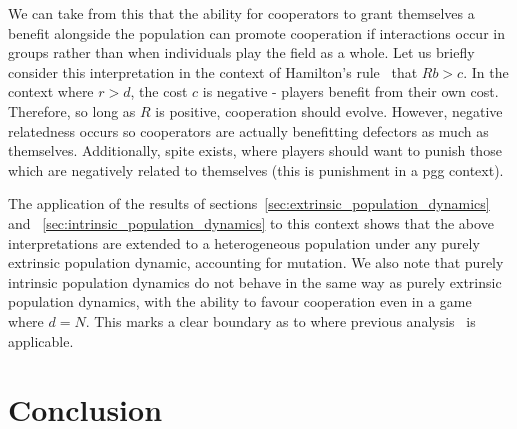 \documentclass{article}
\begin{document}
We can take from this that the ability for cooperators to grant themselves a
benefit alongside the population can promote cooperation if interactions occur
in groups rather than when individuals play the field as a whole. Let us briefly
consider this interpretation in the context of Hamilton's rule~\cite{} that \(Rb
> c\). In the context where \(r > d\), the cost \(c\) is negative - players
benefit from their own cost. Therefore, so long as \(R\) is positive,
cooperation should evolve. However, negative relatedness occurs so cooperators
are actually benefitting defectors as much as themselves. Additionally, spite
exists, where players should want to punish those which are negatively related
to themselves (this is punishment in a pgg context). 


The application of the results of
sections~\ref{sec:extrinsic_population_dynamics} and
~\ref{sec:intrinsic_population_dynamics} to this context shows that the above
interpretations are extended to a heterogeneous population under any purely
extrinsic population dynamic, accounting for mutation. We also note that purely
intrinsic population dynamics do not behave in the same way as purely extrinsic
population dynamics, with the ability to favour cooperation even in a game where
\(d=N\). This marks a clear boundary as to where previous
analysis~\cite{kurokawa_emergence_2009, kurokawa_generous_2010} is applicable.

\section{Conclusion}
\end{document}
